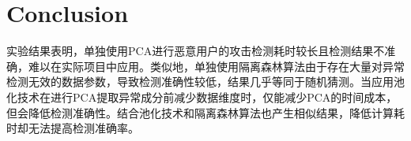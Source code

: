 \documentclass[conference]{IEEEtran}
\begin{document}








\section{Conclusion}
\label{sec:conclusion}





实验结果表明，单独使用PCA进行恶意用户的攻击检测耗时较长且检测结果不准确，难以在实际项目中应用。类似地，单独使用隔离森林算法由于存在大量对异常检测无效的数据参数，导致检测准确性较低，结果几乎等同于随机猜测。当应用池化技术\cite{betterTogether}在进行PCA提取异常成分前减少数据维度时，仅能减少PCA的时间成本，但会降低检测准确性。结合池化技术和隔离森林算法也产生相似结果，降低计算耗时却无法提高检测准确率。
\end{document}
